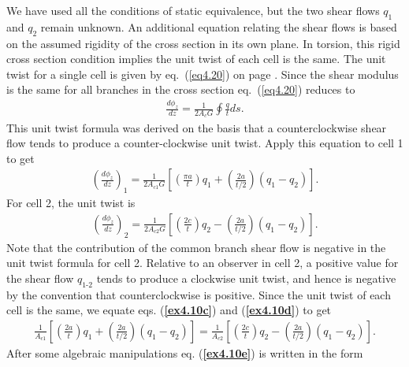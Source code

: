 \documentclass{AeroStructure-ERJohnson}
\begin{document}
\begin{example*}
\vspace*{-\baselineskip}
We have used all the conditions of static equivalence, but the two shear flows $q_1$ and  $q_2$  remain unknown. An additional equation relating the shear flows is based on the assumed rigidity of the cross section in its own plane. In torsion, this rigid cross section condition implies the unit twist of each cell is the same. The unit twist for a single cell is given by eq.~(\ref{eq4.20}) on page \pageref{eq4.20}. Since the shear modulus is the same for all branches in the cross section eq.~(\ref{eq4.20}) reduces to\vspace*{-5pt}
\begin{align}\label{eq4.71}
\frac{d \phi_{z}}{d z}=\frac{1}{2 A_{c} G} \oint\! \frac{q}{t} ds.
\end{align}
This unit twist formula was derived on the basis that a counterclockwise shear flow tends to produce a counter-clockwise unit twist. Apply this equation to cell 1 to get
\begin{align}\label{ex4.10c}
\left(\frac{d \phi_{z}}{d z}\right)_{1}=\frac{1}{2 A_{c 1} G}\left[\left(\frac{\pi a}{t}\right) q_{1}+\left(\frac{2 a}{t/ 2}\right)\left(q_{1}-q_{2}\right)\right].\tag{c}
\end{align}
For cell 2, the unit twist is\vspace*{-5pt}
\begin{align}\label{ex4.10d}
\left(\frac{d \phi_{z}}{d z}\right)_{2}=\frac{1}{2 A_{c 2} G}\left[\left(\frac{2 c}{t}\right) q_{2}-\left(\frac{2 a}{t/ 2}\right)\left(q_{1}-q_{2}\right)\right].\tag{d}
\end{align}
Note that the contribution of the common branch shear flow is negative in the unit twist formula for cell 2. Relative to an observer in cell 2, a positive value for the shear flow $q_{\textrm{1-2}}$ tends to produce a clockwise unit twist, and hence is negative by the convention that counterclockwise is positive. Since the unit twist of each cell is the same, we equate eqs. (\textbf{\ref{ex4.10c}}) and (\textbf{\ref{ex4.10d}}) to get
\begin{align}\label{ex4.10e}
\frac{1}{A_{c 1}}\left[\left(\frac{2 a}{t}\right) q_{1}+\left(\frac{2 a}{t/ 2}\right)\left(q_{1}-q_{2}\right)\right]=\frac{1}{A_{c 2}}\left[\left(\frac{2 c}{t}\right) q_{2}-\left(\frac{2 a}{t/ 2}\right)\left(q_{1}-q_{2}\right)\right].\tag{e}
\end{align}
After some algebraic manipulations eq. (\textbf{\ref{ex4.10e}}) is written in the form\pagebreak
\begin{align}\label{ex4.10f}

\end{align}
\end{example*}
\end{document}
